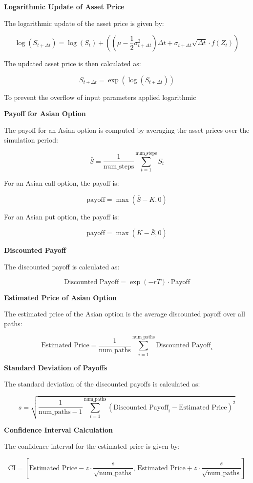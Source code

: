 \documentclass{article}
\begin{document}
\textbf{Logarithmic Update of Asset Price}

The logarithmic update of the asset price is given by:

\[
\log(S_{t + \Delta t}) = \log(S_t) + \left( \left( \mu - \frac{1}{2} \sigma_{t + \Delta t}^2 \right) \Delta t + \sigma_{t + \Delta t} \sqrt{\Delta t} \cdot f(Z_t) \right)
\]

The updated asset price is then calculated as:

\[
S_{t + \Delta t} = \exp\left( \log(S_{t + \Delta t}) \right)
\]

To prevent the overflow of input parameters applied logarithmic 

\textbf{Payoff for Asian Option}

The payoff for an Asian option is computed by averaging the asset prices over the simulation period:

\[
\bar{S} = \frac{1}{\text{num\_steps}} \sum_{t=1}^{\text{num\_steps}} S_t
\]

For an Asian call option, the payoff is:

\[
\text{payoff} = \max(\bar{S} - K, 0)
\]

For an Asian put option, the payoff is:

\[
\text{payoff} = \max(K - \bar{S}, 0)
\]

\textbf{Discounted Payoff}

The discounted payoff is calculated as:

\[
\text{Discounted Payoff} = \exp(-rT) \cdot \text{Payoff}
\]

\textbf{Estimated Price of Asian Option}

The estimated price of the Asian option is the average discounted payoff over all paths:

\[
\text{Estimated Price} = \frac{1}{\text{num\_paths}} \sum_{i=1}^{\text{num\_paths}} \text{Discounted Payoff}_i
\]

\textbf{Standard Deviation of Payoffs}

The standard deviation of the discounted payoffs is calculated as:

\[
s = \sqrt{\frac{1}{\text{num\_paths} - 1} \sum_{i=1}^{\text{num\_paths}} \left( \text{Discounted Payoff}_i - \text{Estimated Price} \right)^2}
\]

\textbf{Confidence Interval Calculation}

The confidence interval for the estimated price is given by:

\[
\text{CI} = \left[ \text{Estimated Price} - z \cdot \frac{s}{\sqrt{\text{num\_paths}}}, \, \text{Estimated Price} + z \cdot \frac{s}{\sqrt{\text{num\_paths}}} \right]
\]
\end{document}
